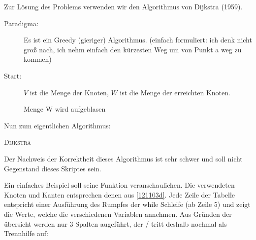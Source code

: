 \documentclass[ngerman,draft,parskip=half*,twoside]{scrreprt}
\theoremstyle{break}
\theoremstyle{nonumberbreak}
\begin{document}
Zur Lösung des Problems verwenden wir den Algorithmus von Dijkstra (1959).

\begin{description}
\item[Paradigma: ] Es ist ein Greedy (gieriger) Algorithmus.
(einfach formuliert: ich denk nicht groß nach, ich nehm einfach den kürzesten Weg um von Punkt a weg zu kommen)
\item[Start: ] $V$ ist die Menge der Knoten, $W$ ist die Menge der erreichten Knoten.
\end{description}

\begin{figure}[H]
  \centering
  \caption{Menge W wird aufgeblasen}
  \label{121103e}
\end{figure}
Nun zum eigentlichen Algorithmus:

\begin{algorithm}
\caption{\textsc{Dijkstra}}
\end{algorithm}

Der Nachweis der Korrektheit dieses Algorithmus ist sehr schwer und
soll nicht Gegenstand dieses Skriptes sein.

Ein einfaches Beispiel soll seine Funktion veranschaulichen. Die verwendeten Knoten und Kanten entsprechen denen
aus \autoref{121103d}. Jede Zeile der Tabelle entspricht einer Ausführung des Rumpfes der while Schleife (ab Zeile 5)
und zeigt die Werte, welche die verschiedenen Variablen annehmen. Aus Gründen der übersicht werden nur 3 Spalten
augeführt, der / tritt deshalb nochmal als Trennhilfe auf:
\end{document}
